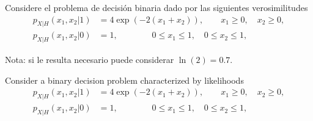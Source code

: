 \ifspanish

\question[20] %

Considere el problema de decisión binaria dado por las siguientes  verosimilitudes
\begin{align}
p_{X|H}(x_1,x_2|1) &= 4 \exp(-2(x_1+x_2)), \qquad  x_1 \ge 0, \quad x_2 \ge 0 ,
\nonumber\\
p_{X|H}(x_1, x_2|0) &= 1, \qquad \qquad 0\le x_1 \le 1, \quad  0\le x_2 \le 1,
\end{align}


Nota: si le resulta necesario puede considerar $\ln(2) = 0.7$.
\begin{solution}

\end{solution}

\else

\question[20] %

Consider a binary decision problem characterized by likelihoods
\begin{align}
p_{X|H}(x_1,x_2|1) &= 4 \exp(-2(x_1+x_2)), \qquad  x_1 \ge 0, \quad x_2 \ge 0 ,
\nonumber\\
p_{X|H}(x_1, x_2|0) &= 1, \qquad \qquad 0\le x_1 \le 1, \quad  0\le x_2 \le 1,
\end{align}

